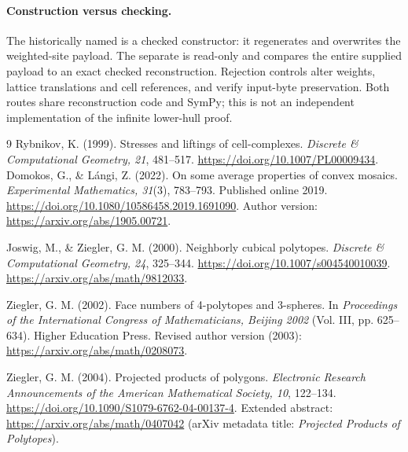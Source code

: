 \documentclass[11pt,a4paper]{article}
\theoremstyle{definition}\newtheorem{definition}[theorem]{Definition}
\theoremstyle{remark}\newtheorem{remark}[theorem]{Remark}
\begin{document}
\paragraph{Construction versus checking.}
The historically named  is a checked constructor: it regenerates and overwrites the weighted-site payload. The separate  is read-only and compares the entire supplied payload to an exact checked reconstruction. Rejection controls alter weights, lattice translations and cell references, and verify input-byte preservation. Both routes share reconstruction code and SymPy; this is not an independent implementation of the infinite lower-hull proof.

\begin{thebibliography}{9}
Rybnikov, K. (1999). Stresses and liftings of cell-complexes. \emph{Discrete \& Computational Geometry, 21}, 481--517. \url{https://doi.org/10.1007/PL00009434}.
Domokos, G., \& L\'angi, Z. (2022). On some average properties of convex mosaics. \emph{Experimental Mathematics, 31}(3), 783--793. Published online 2019. \url{https://doi.org/10.1080/10586458.2019.1691090}. Author version: \url{https://arxiv.org/abs/1905.00721}.

Joswig, M., \& Ziegler, G. M. (2000). Neighborly cubical polytopes. \emph{Discrete \& Computational Geometry, 24}, 325--344. \url{https://doi.org/10.1007/s004540010039}. \url{https://arxiv.org/abs/math/9812033}.

Ziegler, G. M. (2002). Face numbers of 4-polytopes and 3-spheres. In \emph{Proceedings of the International Congress of Mathematicians, Beijing 2002} (Vol. III, pp. 625--634). Higher Education Press. Revised author version (2003): \url{https://arxiv.org/abs/math/0208073}.

Ziegler, G. M. (2004). Projected products of polygons. \emph{Electronic Research Announcements of the American Mathematical Society, 10}, 122--134. \url{https://doi.org/10.1090/S1079-6762-04-00137-4}. Extended abstract: \url{https://arxiv.org/abs/math/0407042} (arXiv metadata title: \emph{Projected Products of Polytopes}).
\end{thebibliography}
\end{document}
